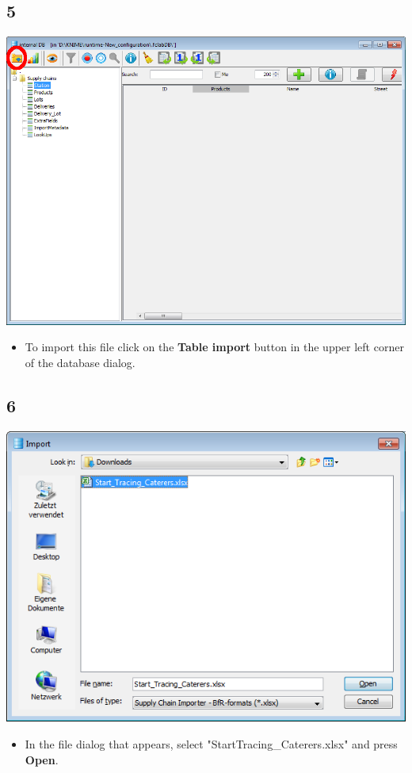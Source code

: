 \documentclass{beamer}
\begin{document}
\subsection{5}
\begin{frame}
	\begin{center}
  		\includegraphics[height=0.6\textheight]{5.png}
	\end{center}
	\begin{itemize}
		\item To import this file click on the \textbf{Table import} button in the upper left corner of the database dialog.
	\end{itemize}
\end{frame}

\subsection{6}
\begin{frame}
	\begin{center}
  		\includegraphics[height=0.5\textheight]{6.png}
	\end{center}
	\begin{itemize}
		\item In the file dialog that appears, select "StartTracing\_Caterers.xlsx" and press \textbf{Open}.
	\end{itemize}
\end{frame}
\end{document}
